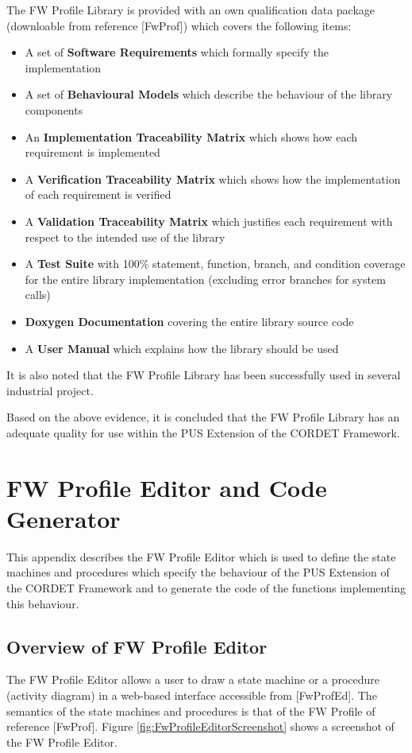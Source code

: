 \documentclass{pnp_article}
\begin{document}
The FW Profile Library is provided with an own qualification data package (downloable from reference [FwProf]) which covers the following items:

\begin{itemize}
\item A set of \textbf{Software Requirements} which formally specify the implementation
\item A set of \textbf{Behavioural Models} which describe the behaviour of the library components
\item An \textbf{Implementation Traceability Matrix} which shows how each requirement is implemented
\item A \textbf{Verification Traceability Matrix} which shows how the implementation of each requirement is verified
\item A \textbf{Validation Traceability Matrix} which justifies each requirement with respect to the intended use of the library
\item A \textbf{Test Suite} with 100\% statement, function, branch, and condition coverage for the entire library implementation (excluding error branches for system calls)
\item \textbf{Doxygen Documentation} covering the entire library source code
\item A \textbf{User Manual} which explains how the library should be used
\end{itemize}

It is also noted that the FW Profile Library has been successfully used in several industrial project.

Based on the above evidence, it is concluded that the FW Profile Library has an adequate quality for use within the PUS Extension of the CORDET Framework.




\newpage
\appendix
\section{FW Profile Editor and Code Generator}\label{sec:svrFwProfEd}
This appendix describes the FW Profile Editor which is used to define the state machines and procedures which specify the behaviour of the PUS Extension of the CORDET Framework and to generate the code of the functions implementing this behaviour.

\subsection{Overview of FW Profile Editor}
The FW Profile Editor allows a user to draw a state machine or a procedure (activity diagram) in a web-based interface accessible from [FwProfEd]. The semantics of the state machines and procedures is that of the FW Profile of reference [FwProf]. Figure \ref{fig:FwProfileEditorScreenshot} shows a screenshot of the FW Profile Editor.
\end{document}

